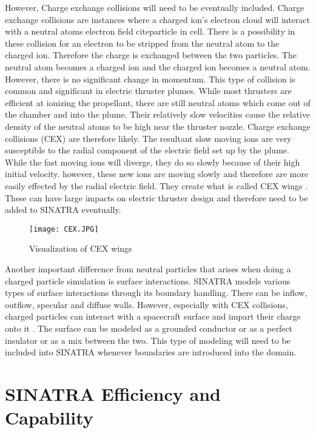 \indent However, Charge exchange collisions will need to be eventually included. Charge exchange collisions are instances where a charged ion's electron cloud will interact with a neutral atoms electron field cite{particle in cell}. There is a possibility in these collision for an electron to be stripped from the neutral atom to the charged ion. Therefore the charge is exchanged between the two particles. The neutral atom becomes a charged ion and the charged ion becomes a neutral atom. However, there is no significant change in momentum. This type of collision is common and significant in electric thruster plumes. While most thrusters are efficient at ionizing the propellant, there are still neutral atoms which come out of the chamber and into the plume. Their relatively slow velocities cause the relative density of the neutral atoms to be high near the thruster nozzle. Charge exchange collisions (CEX) are therefore likely. The resultant slow moving ions are very susceptible to the radial component of the electric field set up by the plume. While the fast moving ions will diverge, they do so slowly because of their high initial velocity. however, these new ions are moving slowly and therefore are more easily effected by the radial electric field. They create what is called CEX wings \cite{cex_wings}. These can have large impacts on electric thruster design and therefore need to be added to SINATRA eventually. 

\begin{figure}
\texttt{[image: CEX.JPG]}
\centering
\caption{Visualization of CEX wings\cite{cex_wings}}
\label{fig:CEX}
\end{figure}

\indent Another important difference from neutral particles that arises when doing a charged particle simulation is surface interactions. SINATRA models various types of surface interactions through its boundary handling. There can be inflow, outflow, specular and diffuse walls. However, especially with CEX collisions, charged particles can interact with a spacecraft surface and impart their charge onto it \cite{surface_charge}. The surface can be modeled as a grounded conductor or as a perfect insulator or as a mix between the two. This type of modeling will need to be included into SINATRA whenever boundaries are introduced into the domain. 

\section{SINATRA Efficiency and Capability}

